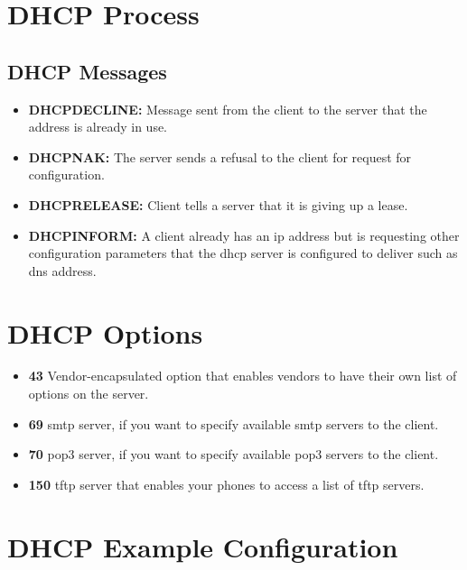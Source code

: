 \section{DHCP Process}


\subsection{DHCP Messages}

\begin{itemize}
    \item \textbf{DHCPDECLINE:} Message sent from the client to the server that the address is already in use.
    \item \textbf{DHCPNAK:} The server sends a refusal to the client for request for configuration.
    \item \textbf{DHCPRELEASE:} Client tells a server that it is giving up a lease.
    \item \textbf{DHCPINFORM:} A client already has an \acrshort{ip} address but is requesting other configuration parameters that the \acrshort{dhcp} server is configured to deliver such as \acrshort{dns} address.
\end{itemize}

\section{DHCP Options}

\begin{itemize}
    \item \textbf{43} Vendor-encapsulated option that enables vendors to have their own list of options on the server.
    \item \textbf{69} \acrshort{smtp} server, if you want to specify available \acrshort{smtp} servers to the client.
    \item \textbf{70} \acrshort{pop3} server, if you want to specify available \acrshort{pop3} servers to the client.
    \item \textbf{150} \acrshort{tftp} server that enables your phones to access a list of \acrshort{tftp} servers.
\end{itemize}

\section{DHCP Example Configuration}

